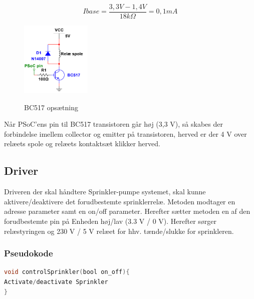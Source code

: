 \begin{equation} 
Ibase = \frac{3,3V - 1,4V}{18k\Omega} = 0,1mA
\label{eq:Ibase}
\end{equation}

\begin{figure}[H] \centering
{\includegraphics[width=0.3\textwidth]{filer/design/Billeder/BC517}}
\caption{BC517 opsætning}
\label{lab:BC517}
\raggedright
\end{figure} 

Når PSoC'ens pin til BC517 transistoren går høj (3,3 V), så skabes der forbindelse imellem collector og emitter på transistoren, herved er der 4 V over relæets spole og relæets kontaktsæt klikker herved. 

\subsection{Driver}

Driveren der skal håndtere Sprinkler-pumpe systemet, skal kunne aktivere/deaktivere det forudbestemte sprinklerrelæ. Metoden modtager en adresse parameter samt en on/off parameter. Herefter sætter metoden en af den forudbestemte pin på Enheden høj/lav (3.3 V / 0 V). Herefter sørger relæstyringen og 230 V / 5 V relæet for hhv. tænde/slukke for sprinkleren. 


\subsubsection*{Pseudokode}

\begin{lstlisting}[language=C]
void controlSprinkler(bool on_off){
Activate/deactivate Sprinkler
}
\end{lstlisting}





 